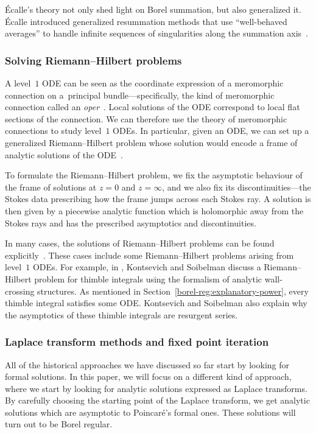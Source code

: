 \documentclass[10pt,a4paper]{amsart}
\numberwithin{equation}{section}
\begin{document}
\'{E}calle's theory not only shed light on Borel summation, but also generalized it. \'{E}calle introduced generalized resummation methods that use ``well-behaved averages'' to handle infinite sequences of singularities along the summation axis~\cite{EcalleI,ecalle-dulac,menous_phdthesis,menous-mould}.
%
\subsubsection{Solving Riemann--Hilbert problems}
%
A level~$1$ ODE can be seen as the coordinate expression of a meromorphic connection on a~principal bundle---specifically, the kind of meromorphic connection called an {\em oper}~\cite{BD-opers}. Local solutions of the ODE correspond to local flat sections of the connection. We can therefore use the theory of meromorphic connections to study level~$1$ ODEs. In particular, given an ODE, we can set up a generalized Riemann--Hilbert problem whose solution would encode a frame of analytic solutions of the ODE~\cite[Section~3.2]{Dubrovin-Heun}.

To formulate the Riemann--Hilbert problem, we fix the asymptotic behaviour of the frame of solutions at $z = 0$ and $z = \infty$, and we also fix its discontinuities---the Stokes data prescribing how the frame jumps across each Stokes ray. A solution is then given by a piecewise analytic function which is holomorphic away from the Stokes rays and has the prescribed asymptotics and discontinuities.

In many cases, the solutions of Riemann--Hilbert problems can be found explicitly~\cite{BBS-RH,Tom-RH-1,Tom-RH-conifold,Dubrovin-tt_star,Dubrovin-Heun,GMN1}. These cases include some Riemann--Hilbert problems arising from level~$1$ ODEs. For example, in \cite[Section~6.2.1]{kontsevich2022analyticity}, Kontsevich and Soibelman discuss a Riemann--Hilbert problem for thimble integrals using the formalism of analytic wall-crossing structures. As mentioned in Section~\ref{borel-reg:explanatory-power}, every thimble integral satisfies some ODE. Kontsevich and Soibelman also explain why the asymptotics of these thimble integrals are resurgent series.
%
\subsubsection{Laplace transform methods and fixed point iteration}
%
All of the historical approaches we have discussed so far start by looking for formal solutions. In this paper, we will focus on a different kind of approach, where we start by looking for analytic solutions expressed as Laplace transforms. By carefully choosing the starting point of the Laplace transform, we get analytic solutions which are asymptotic to Poincar\'e's formal ones. These solutions will turn out to be Borel regular.
\end{document}
